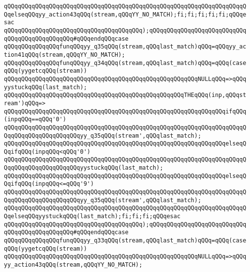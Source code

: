 \verb|qQQqqQQqqQQqqQQqqQQqqQQqqQQqqQQqqQQqqQQqqQQqqQQqqQQqqQQqqQQqqQQqqQQqqQQqelseqQQqyy_action43qQQq(stream,qQQqYY_NO_MATCH);fi;fi;fi;fi;fi;qQQqesac|\newline
\verb|qQQqqQQqqQQqqQQqqQQqqQQqqQQqqQQqqQQqqQQq);qQQqqQQqqQQqqQQqqQQqqQQqqQQqqQQqqQQqqQQqqQQqqQQq#qQQqendqQQqcase|\newline
\verb|qQQqqQQqqQQqqQQqfunqQQqyy_q35qQQq(stream,qQQqlast_match)qQQq=qQQqyy_action41qQQq(stream,qQQqYY_NO_MATCH);|\newline
\verb|qQQqqQQqqQQqqQQqfunqQQqyy_q34qQQq(stream,qQQqlast_match)qQQq=qQQq(caseqQQq(yygetcqQQq(stream))|\newline
\verb|qQQqqQQqqQQqqQQqqQQqqQQqqQQqqQQqqQQqqQQqqQQqqQQqqQQqqQQqNULLqQQq=>qQQqyystuckqQQq(last_match);|\newline
\verb|qQQqqQQqqQQqqQQqqQQqqQQqqQQqqQQqqQQqqQQqqQQqqQQqqQQqTHEqQQq(inp,qQQqstream')qQQq=>|\newline
\verb|qQQqqQQqqQQqqQQqqQQqqQQqqQQqqQQqqQQqqQQqqQQqqQQqqQQqqQQqqQQqqQQqifqQQq(inpqQQq==qQQq'0')|\newline
\verb|qQQqqQQqqQQqqQQqqQQqqQQqqQQqqQQqqQQqqQQqqQQqqQQqqQQqqQQqqQQqqQQqqQQqqQQqqQQqqQQqqQQqqQQqqQQqyy_q35qQQq(stream',qQQqlast_match);|\newline
\verb|qQQqqQQqqQQqqQQqqQQqqQQqqQQqqQQqqQQqqQQqqQQqqQQqqQQqqQQqqQQqqQQqelseqQQqifqQQq(inpqQQq<qQQq'0')|\newline
\verb|qQQqqQQqqQQqqQQqqQQqqQQqqQQqqQQqqQQqqQQqqQQqqQQqqQQqqQQqqQQqqQQqqQQqqQQqqQQqqQQqqQQqqQQqqQQqyystuckqQQq(last_match);|\newline
\verb|qQQqqQQqqQQqqQQqqQQqqQQqqQQqqQQqqQQqqQQqqQQqqQQqqQQqqQQqqQQqqQQqelseqQQqifqQQq(inpqQQq<=qQQq'9')|\newline
\verb|qQQqqQQqqQQqqQQqqQQqqQQqqQQqqQQqqQQqqQQqqQQqqQQqqQQqqQQqqQQqqQQqqQQqqQQqqQQqqQQqqQQqqQQqqQQqyy_q35qQQq(stream',qQQqlast_match);|\newline
\verb|qQQqqQQqqQQqqQQqqQQqqQQqqQQqqQQqqQQqqQQqqQQqqQQqqQQqqQQqqQQqqQQqqQQqqQQqelseqQQqyystuckqQQq(last_match);fi;fi;fi;qQQqesac|\newline
\verb|qQQqqQQqqQQqqQQqqQQqqQQqqQQqqQQqqQQqqQQq);qQQqqQQqqQQqqQQqqQQqqQQqqQQqqQQqqQQqqQQqqQQqqQQq#qQQqendqQQqcase|\newline
\verb|qQQqqQQqqQQqqQQqfunqQQqyy_q33qQQq(stream,qQQqlast_match)qQQq=qQQq(caseqQQq(yygetcqQQq(stream))|\newline
\verb|qQQqqQQqqQQqqQQqqQQqqQQqqQQqqQQqqQQqqQQqqQQqqQQqqQQqqQQqNULLqQQq=>qQQqyy_action43qQQq(stream,qQQqYY_NO_MATCH);|\newline
